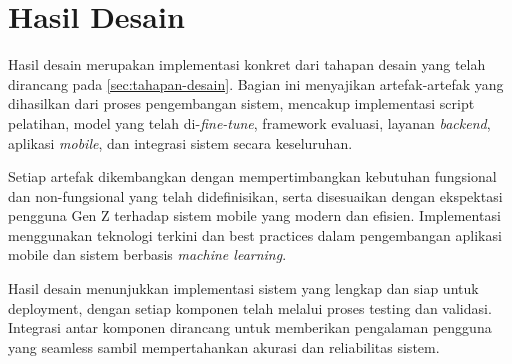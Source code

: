 \section{Hasil Desain}
\label{sec:hasil-desain}

Hasil desain merupakan implementasi konkret dari tahapan desain yang telah dirancang pada \autoref{sec:tahapan-desain}. Bagian ini menyajikan artefak-artefak yang dihasilkan dari proses pengembangan sistem, mencakup implementasi script pelatihan, model yang telah di-\emph{fine-tune}, framework evaluasi, layanan \emph{backend}, aplikasi \emph{mobile}, dan integrasi sistem secara keseluruhan.

Setiap artefak dikembangkan dengan mempertimbangkan kebutuhan fungsional dan non-fungsional yang telah didefinisikan, serta disesuaikan dengan ekspektasi pengguna Gen Z terhadap sistem mobile yang modern dan efisien. Implementasi menggunakan teknologi terkini dan best practices dalam pengembangan aplikasi mobile dan sistem berbasis \emph{machine learning}.


Hasil desain menunjukkan implementasi sistem yang lengkap dan siap untuk deployment, dengan setiap komponen telah melalui proses testing dan validasi. Integrasi antar komponen dirancang untuk memberikan pengalaman pengguna yang seamless sambil mempertahankan akurasi dan reliabilitas sistem.











